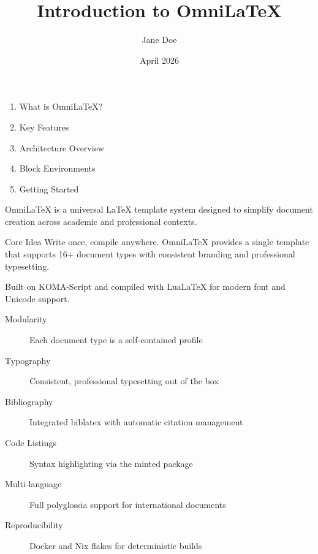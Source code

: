 \documentclass[
    language=english,
    doctype=presentation,
    institution=none,
]{../../omnilatex}
\title{Introduction to OmniLaTeX}
\author{Jane Doe}
\date{April 2026}
\begin{document}

\maketitle


\begin{presentationframe}

    \begin{enumerate}
        \item What is OmniLaTeX?
        \item Key Features
        \item Architecture Overview
        \item Block Environments
        \item Getting Started
    \end{enumerate}
\end{presentationframe}


\begin{presentationframe}

    OmniLaTeX is a universal \LaTeX{} template system designed to simplify
    document creation across academic and professional contexts.

    \begin{presentationblock}{Core Idea}
        Write once, compile anywhere. OmniLaTeX provides a single template
        that supports 16+ document types with consistent branding and
        professional typesetting.
    \end{presentationblock}

    \vspace{2mm}
    Built on KOMA-Script and compiled with LuaLaTeX for modern font
    and Unicode support.
\end{presentationframe}


\begin{presentationframe}

    \begin{description}
        \item[Modularity] Each document type is a self-contained profile
        \item[Typography] Consistent, professional typesetting out of the box
        \item[Bibliography] Integrated biblatex with automatic citation management
        \item[Code Listings] Syntax highlighting via the minted package
        \item[Multi-language] Full polyglossia support for international documents
        \item[Reproducibility] Docker and Nix flakes for deterministic builds
    \end{description}
\end{presentationframe}
\end{document}
